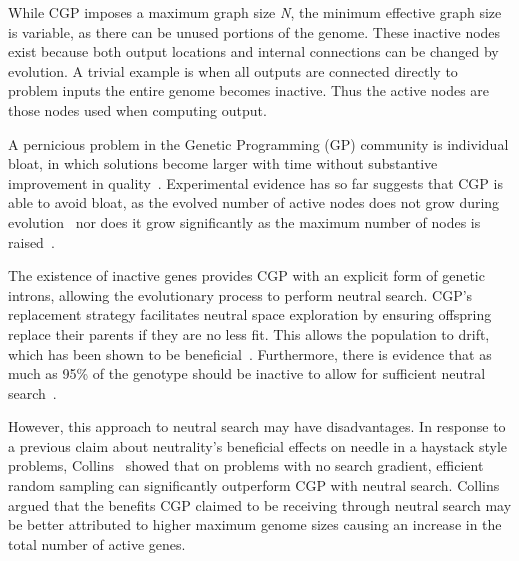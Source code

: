 \documentclass{sig-alternate}
\begin{document}
While CGP imposes a maximum graph size \emph{N}, the minimum
effective graph size is variable, as there can be unused portions
of the genome.  These inactive nodes exist because both output locations and
internal connections can be changed by evolution.  A trivial example is when all outputs
are connected directly to problem inputs the entire genome becomes
inactive.  Thus the active nodes are those nodes used when computing output.

A pernicious problem in the Genetic Programming (GP) community is individual bloat, in which solutions
become larger with time without substantive improvement in quality~\cite{luke:2006:bloat}.
Experimental evidence has so far suggests that CGP is able to avoid
bloat, as the evolved number of active
nodes does not grow during evolution~\cite{miller:2001:bloat} nor does it grow significantly
as the maximum number of nodes is raised~\cite{miller:2006:redundancy}.

The existence of inactive genes provides CGP with an explicit form of genetic
introns, allowing the evolutionary process to perform neutral search.
CGP's replacement strategy facilitates neutral space
exploration by ensuring offspring replace their parents if they are no less fit.
This allows the population to drift,
which has been shown to be beneficial~\cite{yu:2001:neutrality}.  Furthermore,
there is evidence that as much as 95\% of the genotype should be inactive
to allow for sufficient neutral search~\cite{miller:2006:redundancy}.

However, this approach to neutral search may have disadvantages.  In response to a previous claim
about neutrality's beneficial effects on needle in a haystack style
problems, Collins~\cite{collins:2006:haystacks} showed that on problems with no search
gradient, efficient random sampling can significantly outperform CGP with neutral search.
Collins argued that the benefits CGP claimed to be receiving through neutral search
may be better attributed to higher maximum genome sizes causing an increase in
the total number of active genes.
\end{document}
